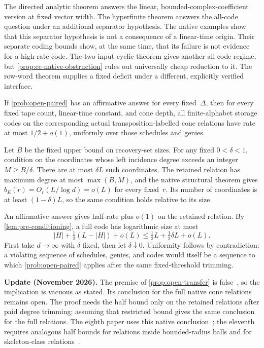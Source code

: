 The directed analytic theorem answers the linear, bounded-complex-coefficient version at fixed vector width. The hyperfinite theorem answers the all-code question under an additional separator hypothesis. The native examples show that this separator hypothesis is not a consequence of a linear-time origin. Their separate coding bounds show, at the same time, that its failure is not evidence for a high-rate code. The two-input cyclic theorem gives another all-code regime, but \cref{prop:cc-native-obstruction} rules out universally cheap reduction to it. The row-word theorem supplies a fixed deficit under a different, explicitly verified interface.

\begin{proposition}\label{prop:open-transfer}
\notformalized
If \cref{prob:open-paired} has an affirmative answer for every fixed~$\Delta$, then for every fixed tape count, linear-time constant, and cone depth, all finite-alphabet storage codes on the corresponding actual transposition-labelled cone relations have rate at most $1/2+o(1)$, uniformly over those schedules and genies.
\end{proposition}
\begin{informalproof}
Let $B$ be the fixed upper bound on recovery-set sizes. For any fixed $0<\delta<1$, condition on the coordinates whose left incidence degree exceeds an integer $M\ge B/\delta$. There are at most $\delta L$ such coordinates. The retained relation has maximum degree at most $\max(B,M)$, and the native structural theorem gives $b_E(r)=O_r(L/\log d)=o(L)$ for every fixed~$r$. Its number of coordinates is at least $(1-\delta)L$, so the same condition holds relative to its size.

An affirmative answer gives half-rate plus $o(1)$ on the retained relation. By \cref{lem:pre-conditioning}, a full code has logarithmic size at most
\[
 |H|+\tfrac12(L-|H|)+o(L)
 \le\tfrac12L+\tfrac12\delta L+o(L).
\]
First take $d\to\infty$ with $\delta$ fixed, then let $\delta\downarrow0$. Uniformity follows by contradiction: a violating sequence of schedules, genies, and codes would itself be a sequence to which \cref{prob:open-paired} applies after the same fixed-threshold trimming.
\end{informalproof}

\textbf{Update (November 2026).} The premise of \cref{prop:open-transfer} is false~\cite{StorageCodes2026}, so the implication is vacuous as stated. Its conclusion for the full native cone relations remains open. The proof needs the half bound only on the retained relations after paid degree trimming; assuming that restricted bound gives the same conclusion for the full relations. The eighth paper uses this native conclusion~\cite{BoundedNesting2026}; the eleventh requires analogous half bounds for relations inside bounded-radius balls and for skeleton-class relations~\cite[Section~2]{MergeDepth2026}.

